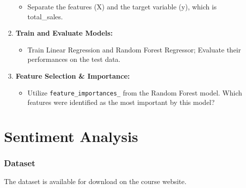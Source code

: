 \documentclass{article}
\begin{document}
\begin{enumerate}
		\begin{itemize}
			\item Separate the features (X) and the target variable (y), which is total\_sales.
		\end{itemize}
		\item \textbf{Train and Evaluate Models:}
		\begin{itemize}
			\item Train Linear Regression and Random Forest Regressor; Evaluate their performances on the test data.
		\end{itemize}
		\item \textbf{Feature Selection \& Importance:}
		\begin{itemize}
			\item Utilize \texttt{feature\_importances\_} from the Random Forest model. Which features were identified as the most important by this model?
		\end{itemize}
	\end{enumerate}
	\newpage
	\part{Sentiment Analysis}
	\section*{Dataset}
	The dataset is available for download on the course website.
\end{document}
